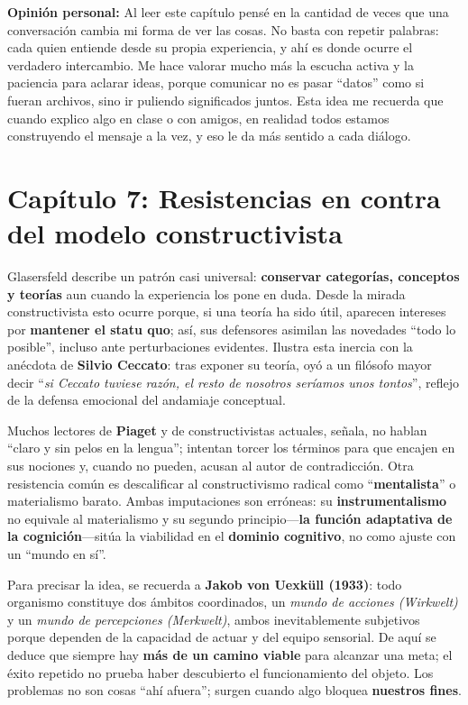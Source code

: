 \documentclass{article}
\begin{document}
\textbf{Opinión personal:}  
Al leer este capítulo pensé en la cantidad de veces que una conversación cambia mi forma de ver las cosas. No basta con repetir palabras: cada quien entiende desde su propia experiencia, y ahí es donde ocurre el verdadero intercambio. Me hace valorar mucho más la escucha activa y la paciencia para aclarar ideas, porque comunicar no es pasar “datos” como si fueran archivos, sino ir puliendo significados juntos. Esta idea me recuerda que cuando explico algo en clase o con amigos, en realidad todos estamos construyendo el mensaje a la vez, y eso le da más sentido a cada diálogo.

\section*{Capítulo 7: Resistencias en contra del modelo constructivista}

Glasersfeld describe un patrón casi universal: \textbf{conservar categorías, conceptos y teorías} aun cuando la experiencia los pone en duda. Desde la mirada constructivista esto ocurre porque, si una teoría ha sido útil, aparecen intereses por \textbf{mantener el statu quo}; así, sus defensores asimilan las novedades “todo lo posible”, incluso ante perturbaciones evidentes. Ilustra esta inercia con la anécdota de \textbf{Silvio Ceccato}: tras exponer su teoría, oyó a un filósofo mayor decir “\emph{si Ceccato tuviese razón, el resto de nosotros seríamos unos tontos}”, reflejo de la defensa emocional del andamiaje conceptual.

Muchos lectores de \textbf{Piaget} y de constructivistas actuales, señala, no hablan “claro y sin pelos en la lengua”; intentan torcer los términos para que encajen en sus nociones y, cuando no pueden, acusan al autor de contradicción. Otra resistencia común es descalificar al constructivismo radical como “\textbf{mentalista}” o materialismo barato. Ambas imputaciones son erróneas: su \textbf{instrumentalismo} no equivale al materialismo y su segundo principio—\textbf{la función adaptativa de la cognición}—sitúa la viabilidad en el \textbf{dominio cognitivo}, no como ajuste con un “mundo en sí”.

Para precisar la idea, se recuerda a \textbf{Jakob von Uexküll (1933)}: todo organismo constituye dos ámbitos coordinados, un \emph{mundo de acciones (Wirkwelt)} y un \emph{mundo de percepciones (Merkwelt)}, ambos inevitablemente subjetivos porque dependen de la capacidad de actuar y del equipo sensorial. De aquí se deduce que siempre hay \textbf{más de un camino viable} para alcanzar una meta; el éxito repetido no prueba haber descubierto el funcionamiento del objeto. Los problemas no son cosas “ahí afuera”; surgen cuando algo bloquea \textbf{nuestros fines}.
\end{document}
